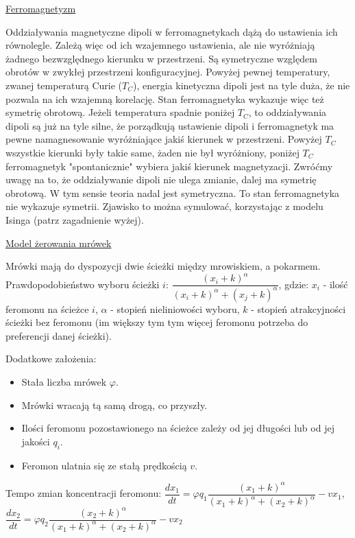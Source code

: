\underline{Ferromagnetyzm}

Oddziaływania magnetyczne dipoli w ferromagnetykach dążą do ustawienia ich równolegle. Zależą więc od ich wzajemnego ustawienia, ale nie wyróżniają żadnego bezwzględnego kierunku w przestrzeni. Są symetryczne względem obrotów w zwykłej przestrzeni konfiguracyjnej. Powyżej pewnej temperatury, zwanej temperaturą Curie ($ T_C $), energia kinetyczna dipoli jest na tyle duża, że nie pozwala na ich wzajemną korelację. Stan ferromagnetyka wykazuje więc też symetrię obrotową. Jeżeli temperatura spadnie poniżej $ T_C $, to oddziaływania dipoli są już na tyle silne, że porządkują ustawienie dipoli i ferromagnetyk ma pewne namagnesowanie wyróżniające jakiś kierunek w przestrzeni. Powyżej $ T_C $ wszystkie kierunki były takie same, żaden nie był wyróżniony, poniżej $ T_C $ ferromagnetyk "spontanicznie" wybiera jakiś kierunek magnetyzacji. Zwróćmy uwagę na to, że oddziaływanie dipoli nie ulega zmianie, dalej ma symetrię obrotową. W tym sensie teoria nadal jest symetryczna. To stan ferromagnetyka nie wykazuje symetrii. Zjawisko to można symulować, korzystając z modelu Isinga (patrz zagadnienie wyżej).

\underline{Model żerowania mrówek}

Mrówki mają do dyspozycji dwie ścieżki między mrowiskiem, a pokarmem. Prawdopodobieństwo wyboru ścieżki $ i $:\newline
$ \dfrac{(x_i + k)^{\alpha}}{(x_i + k)^{\alpha} + (x_j + k)^{\alpha}} $, gdzie:\newline
$ x_i $ - ilość feromonu na ścieżce $ i $,\newline
$ \alpha $ - stopień nieliniowości wyboru,\newline
$ k $ - stopień atrakcyjności ścieżki bez feromonu (im większy tym tym więcej feromonu potrzeba do preferencji danej ścieżki).

Dodatkowe założenia:
\begin{itemize}
	\item Stała liczba mrówek $ \varphi $.
	\item Mrówki wracają tą samą drogą, co przyszły.
	\item Ilości feromonu pozostawionego na ścieżce zależy od jej długości lub od jej jakości $ q_i $.
	\item Feromon ulatnia się ze stałą prędkością $ v $.
\end{itemize}

Tempo zmian koncentracji feromonu:\newline
$ \dfrac{dx_1}{dt} = \varphi q_1 \dfrac{(x_1 + k)^{\alpha}}{(x_1 + k)^{\alpha} + (x_2 + k)^{\alpha}} - vx_1 $,\newline
$ \dfrac{dx_2}{dt} = \varphi q_2 \dfrac{(x_2 + k)^{\alpha}}{(x_1 + k)^{\alpha} + (x_2 + k)^{\alpha}} - vx_2 $


